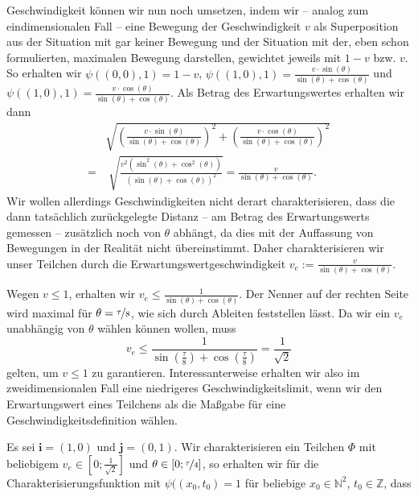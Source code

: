 \documentclass[a4paper,12pt,ngerman]{scrartcl}
\theoremstyle{plain}
\theoremstyle{plain}
\theoremstyle{plain}
\theoremstyle{plain}
\newcommand{\Z}{\mathbb{Z}}
\newcommand{\N}{\mathbb{N}}
\begin{document}
Geschwindigkeit können wir nun noch umsetzen, indem wir -- analog zum eindimensionalen Fall -- eine Bewegung der Geschwindigkeit $v$ als Superposition aus der Situation mit gar keiner Bewegung und der Situation mit der, eben schon formulierten, maximalen Bewegung darstellen, gewichtet jeweils mit $1-v$ bzw. $v$. So erhalten wir $\psi((0,0),1)=1-v$,\; $\psi((1,0),1)=\frac{v\cdot\sin(\theta)}{\sin(\theta)+\cos(\theta)}$ und $\psi((1,0),1)=\frac{v\cdot\cos(\theta)}{\sin(\theta)+\cos(\theta)}$. Als Betrag des Erwartungswertes erhalten wir dann
\begin{align*}
&\sqrt{\left(\frac{v\cdot\sin(\theta)}{\sin(\theta)+\cos(\theta)}\right)^2+\left(\frac{v\cdot\cos(\theta)}{\sin(\theta)+\cos(\theta)}\right)^2}\\
=&\;\sqrt{\frac{v^2(\sin^2(\theta)+\cos^2(\theta))}{(\sin(\theta)+\cos(\theta))^2}}=\frac{v}{\sin(\theta)+\cos(\theta)}.
\end{align*}
Wir wollen allerdings Geschwindigkeiten nicht derart charakterisieren, dass die dann tatsächlich zurückgelegte Distanz -- am Betrag des Erwartungswerts gemessen -- zusätzlich noch von $\theta$ abhängt, da dies mit der Auffassung von Bewegungen in der Realität nicht übereinstimmt. Daher charakterisieren wir unser Teilchen durch die 
Erwartungswertgeschwindigkeit $v_e:=\frac{v}{\sin(\theta)+\cos(\theta)}.$ 

Wegen $v\leq1$, erhalten wir $v_e\leq\frac{1}{\sin(\theta)+\cos(\theta)}$. Der Nenner auf der rechten Seite wird maximal für $\theta=\nicefrac{\tau}{8}$, wie sich durch Ableiten feststellen lässt. Da wir ein $v_e$ unabhängig von $\theta$ wählen können wollen, muss 
\[v_e\leq\frac{1}{\sin\left(\frac{\tau}{8}\right)+\cos\left(\frac{\tau}{8}\right)}=\frac{1}{\sqrt{2}}\]
gelten, um $v\leq1$ zu garantieren. Interessanterweise erhalten wir also im zweidimensionalen Fall eine niedrigeres Geschwindigkeitslimit, wenn wir den Erwartungswert eines Teilchens als die Maßgabe für eine Geschwindigkeitsdefinition wählen. 

Es sei $\pmb{i}=(1,0)$ und $\pmb{j}=(0,1)$. Wir charakterisieren ein Teilchen $\Phi$ mit beliebigem $v_e\in[0;\frac{1}{\sqrt{2}}]$ und $\theta\in[0;\nicefrac{\tau}{4}]$, so erhalten wir für die Charakterisierungsfunktion mit $\psi((x_0,t_0)=1$ für beliebige $x_0\in\N^2$, $t_0\in\Z$, dass 
\end{document}

